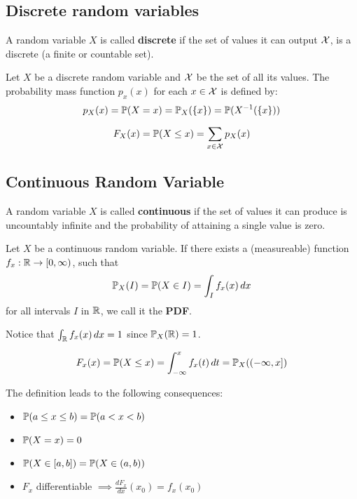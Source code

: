\subsection{Discrete random variables}
A random variable \(X\) is called \textbf{discrete} if the set of values it can output \(\DX\), is a discrete (a finite or countable set).

\begin{ddefinition*}
  Let \(X\) be a discrete random variable and \(\DX\) be the set of all its values. The probability mass function \(p_x(x)\) for each \(x \in \DX\) is defined by:
  \[p_X(x) = \P(X = x) = \P_X(\{x\}) = \P(X^{-1}(\{x\}))\]
\end{ddefinition*}

\begin{ddefinition*} \vspace{-5pt}
  \[F_X(x) = \P(X \leq x) = \sum_{x \in \DX} p_X(x)\]
\end{ddefinition*}

\subsection{Continuous Random Variable}
A random variable \(X\) is called \textbf{continuous} if the set of values it can produce is uncountably infinite and the probability of attaining a single value is zero.

\begin{cdefinition*}
  Let \(X\) be a continuous random variable. If there exists a (measureable) function \(f_x: \R \to [0, \infty)\), such that
  \[\P_X(I) = \P(X \in I) = \int_I f_x(x) \,dx\]
  for all intervals \(I\) in \(\R\), we call it the \textbf{PDF}.
\end{cdefinition*}

Notice that \(\int_\R f_x(x) \, dx = 1\) since \(\P_X(\R) = 1\).

\begin{cdefinition*} \vspace{-5pt}
  \[F_x(x) = \P(X \leq x) = \int_{-\infty}^x f_x(t) \,dt = \P_X((-\infty, x])\]
\end{cdefinition*}
The definition leads to the following consequences:
\begin{itemize}
  \item \(\P(a \leq x \leq b) = \P(a < x < b)\)
  \item \(\P(X = x) = 0\)
  \item \(\P(X \in [a, b]) = \P(X \in (a, b))\)
  \item \(F_x\) differentiable \(\implies \frac{dF_x}{dx}(x_0) = f_x(x_0)\)
\end{itemize}
